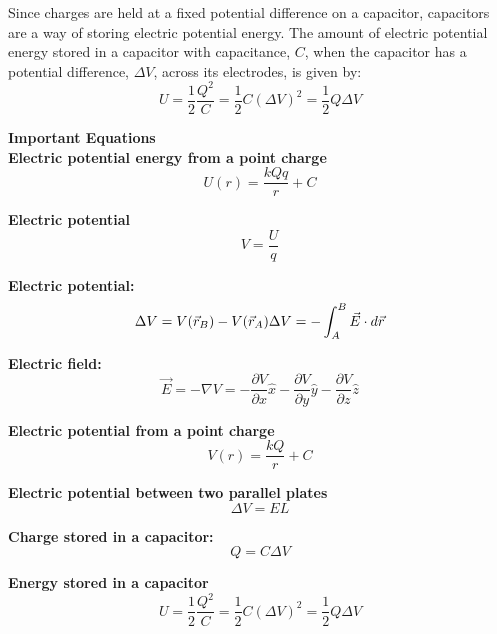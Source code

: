 Since charges are held at a fixed potential difference on a capacitor, capacitors are a way of storing electric potential energy. The amount of electric potential energy stored in a capacitor with capacitance, $C$, when the capacitor has a potential difference, $\Delta V$, across its electrodes, is given by:
\begin{equation}
U = \frac{1}{2}\frac{Q^2}{C} = \frac{1}{2}C(\Delta V)^2=\frac{1}{2}Q\Delta V
\end{equation}

\begin{framed}
\textbf{Important Equations}\\
\textbf{Electric potential energy from a point charge}
\begin{equation}
U(r)=\frac{kQq}{r}+C
\end{equation}

\textbf{Electric potential}
\begin{equation}
V=\frac{U}{q}
\end{equation}

\textbf{Electric potential:}
\begin{equation}
\Delta V = V(\vec r_B)-V(\vec r_A)\\
\Delta V = -\int_{A}^{B}\vec E \cdot d\vec r
\end{equation}

\textbf{Electric field:}
\begin{equation}
\vec E=-\nabla V =-\frac{\partial V}{\partial x}\hat x-\frac{\partial V}{\partial y}\hat y-\frac{\partial V}{\partial z}\hat z
\end{equation}

\textbf{Electric potential from a point charge}
\begin{equation}
V(r)=\frac{kQ}{r}+C
\end{equation}

\textbf{Electric potential between two parallel plates}
\begin{equation}
\Delta V = EL
\end{equation}

\textbf{Charge stored in a capacitor:}
\begin{equation}
Q = C\Delta V
\end{equation}

\textbf{Energy stored in a capacitor}
\begin{equation}
U = \frac{1}{2}\frac{Q^2}{C} = \frac{1}{2}C(\Delta V)^2=\frac{1}{2}Q\Delta V
\end{equation}
\end{framed}

